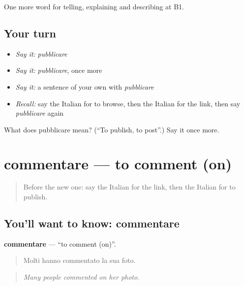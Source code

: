 \begin{grammarlens}[title={What you've built}]
One more word for telling, explaining and describing at B1.
\end{grammarlens}

\subsection*{Your turn}
\begin{itemize}
\raggedright
  \item \emph{Say it:} \emph{pubblicare}
  \item \emph{Say it:} \emph{pubblicare}, once more
  \item \emph{Say it:} a sentence of your own with \emph{pubblicare}
  \item \emph{Recall:} say the Italian for to browse, then the Italian for the link, then say \emph{pubblicare} again
\end{itemize}

\begin{tcolorbox}[breakable,colback=teal!4,colframe=teal!35!black,title={Before you move on}]
What does pubblicare mean? (\textquotedblleft{}To publish, to post\textquotedblright{}.) Say it once more.
\end{tcolorbox}
\section[commentare]{commentare — to comment (on)}

\label{lesson:IT-C403-commentare}



\begin{quote}
Before the new one: say the Italian for the link, then the Italian for to publish.
\end{quote}

\subsection*{You'll want to know: commentare}
\textbf{commentare} — \textquotedblleft{}to comment (on)\textquotedblright{}.

\begin{quote}
Molti hanno commentato la sua foto.
\end{quote}

\begin{quote}
\emph{Many people commented on her photo.}
\end{quote}


